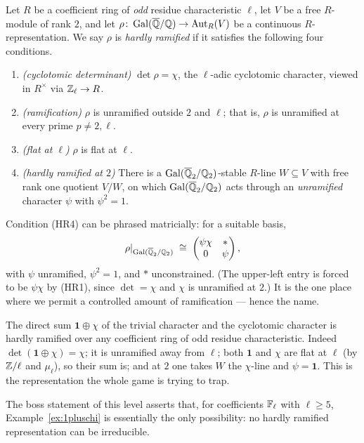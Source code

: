 \documentclass[11pt]{article}
\begin{document}
\begin{definition}\label{def:hr}
Let $R$ be a coefficient ring of \emph{odd} residue characteristic $\ell$, let
$V$ be a free $R$-module of rank $2$, and let $\rho\colon\operatorname{Gal}(\overline{\mathbb{Q}}/\mathbb{Q})\to\operatorname{Aut}_R(V)$ be a
continuous $R$-representation. We say $\rho$ is \emph{hardly ramified} if it
satisfies the following four conditions.
\begin{enumerate}
\item[\textup{(HR1)}] \emph{(cyclotomic determinant)} $\det\rho=\chi$, the
$\ell$-adic cyclotomic character, viewed in $R^\times$ via $\mathbb{Z}_\ell\to R$.
\item[\textup{(HR2)}] \emph{(ramification)} $\rho$ is unramified outside $2$
and $\ell$; that is, $\rho$ is unramified at every prime $p\neq 2,\ell$.
\item[\textup{(HR3)}] \emph{(flat at $\ell$)} $\rho$ is flat at $\ell$.
\item[\textup{(HR4)}] \emph{(hardly ramified at $2$)} There is a
$\operatorname{Gal}(\overline{\mathbb{Q}}_2/\mathbb{Q}_2)$-stable $R$-line $W\subseteq V$ with free rank one quotient
$V/W$, on which $\operatorname{Gal}(\overline{\mathbb{Q}}_2/\mathbb{Q}_2)$ acts through an \emph{unramified}
character $\psi$ with $\psi^2=1$.
\end{enumerate}
\end{definition}

\noindent
Condition (HR4) can be phrased matricially: for a suitable basis,
\[
  \rho|_{\operatorname{Gal}(\overline{\mathbb{Q}}_2/\mathbb{Q}_2)}\;\cong\;
  \begin{pmatrix}\psi\chi & * \\ 0 & \psi\end{pmatrix},
\]
with $\psi$ unramified, $\psi^2=1$, and $*$ unconstrained. (The upper-left
entry is forced to be $\psi\chi$ by \textup{(HR1)}, since $\det=\chi$ and $\chi$
is unramified at $2$.) It is the one place where we permit a controlled amount
of ramification --- hence the name.

\begin{example}\label{ex:1pluschi}
The direct sum $\mathbf 1\oplus\chi$ of the trivial character and the
cyclotomic character is hardly ramified over any coefficient ring of odd
residue characteristic. Indeed $\det(\mathbf 1\oplus\chi)=\chi$; it is
unramified away from $\ell$; both $\mathbf 1$ and $\chi$ are flat at $\ell$ (by
$\mathbb{Z}/\ell$ and $\mu_\ell$), so their sum is; and at $2$ one takes $W$ the
$\chi$-line and $\psi=\mathbf 1$. This is the representation the whole game is
trying to trap.
\end{example}

The boss statement of this level asserts that, for coefficients $\mathbb{F}_\ell$ with
$\ell\geq5$, Example~\ref{ex:1pluschi} is essentially the only possibility: no
hardly ramified representation can be irreducible.
\end{document}
